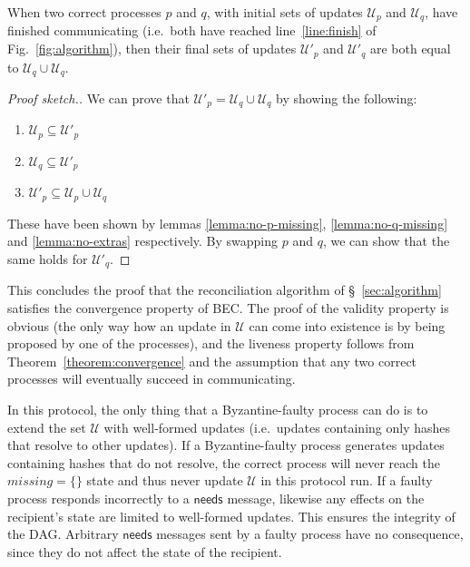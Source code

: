\documentclass[manuscript,anonymous]{acmart}
\begin{document}
\begin{theorem}\label{theorem:convergence}
When two correct processes $p$ and $q$, with initial sets of updates $\mathcal{U}_p$ and $\mathcal{U}_q$, have finished communicating (i.e.\ both have reached line~\ref{line:finish} of Fig.~\ref{fig:algorithm}), then their final sets of updates $\mathcal{U}'_p$ and $\mathcal{U}'_q$  are both equal to $\mathcal{U}_q \cup \mathcal{U}_q$.
\end{theorem}
\begin{proof}[Proof sketch.]
We can prove that $\mathcal{U}'_p = \mathcal{U}_q \cup \mathcal{U}_q$ by showing the following:
\begin{enumerate}
   \item $\mathcal{U}_p \subseteq \mathcal{U}'_p$
   \item $\mathcal{U}_q \subseteq \mathcal{U}'_p$
   \item $\mathcal{U}'_p \subseteq \mathcal{U}_p \cup \mathcal{U}_q$
\end{enumerate}

These have been shown by lemmas \ref{lemma:no-p-missing}, \ref{lemma:no-q-missing} and \ref{lemma:no-extras} respectively.  
By swapping $p$ and $q$, we can show that the same holds for $\mathcal{U}'_q$.
\end{proof}

This concludes the proof that the reconciliation algorithm of \S~\ref{sec:algorithm} satisfies the convergence property of BEC.
The proof of the validity property is obvious (the only way how an update in $\mathcal{U}$ can come into existence is by being proposed by one of the processes), and the liveness property follows from Theorem~\ref{theorem:convergence} and the assumption that any two correct processes will eventually succeed in communicating.

In this protocol, the only thing that a Byzantine-faulty process can do is to extend the set $\mathcal{U}$ with well-formed updates (i.e.\ updates containing only hashes that resolve to other updates).
If a Byzantine-faulty process generates updates containing hashes that do not resolve, the correct process will never reach the $\mathit{missing} = \{\}$ state and thus never update $\mathcal{U}$ in this protocol run.
If a faulty process responds incorrectly to a $\mathsf{needs}$ message, likewise any effects on the recipient's state are limited to well-formed updates.
This ensures the integrity of the DAG.
Arbitrary $\mathsf{needs}$ messages sent by a faulty process have no consequence, since they do not affect the state of the recipient.

\end{document}
